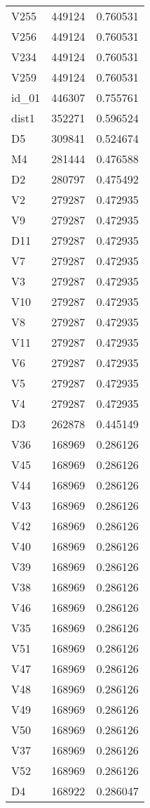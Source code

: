 \begin{tabular}{lrr}
V255 & 449124 & 0.760531 \\
V256 & 449124 & 0.760531 \\
V234 & 449124 & 0.760531 \\
V259 & 449124 & 0.760531 \\
id_01 & 446307 & 0.755761 \\
dist1 & 352271 & 0.596524 \\
D5 & 309841 & 0.524674 \\
M4 & 281444 & 0.476588 \\
D2 & 280797 & 0.475492 \\
V2 & 279287 & 0.472935 \\
V9 & 279287 & 0.472935 \\
D11 & 279287 & 0.472935 \\
V7 & 279287 & 0.472935 \\
V3 & 279287 & 0.472935 \\
V10 & 279287 & 0.472935 \\
V8 & 279287 & 0.472935 \\
V11 & 279287 & 0.472935 \\
V6 & 279287 & 0.472935 \\
V5 & 279287 & 0.472935 \\
V4 & 279287 & 0.472935 \\
D3 & 262878 & 0.445149 \\
V36 & 168969 & 0.286126 \\
V45 & 168969 & 0.286126 \\
V44 & 168969 & 0.286126 \\
V43 & 168969 & 0.286126 \\
V42 & 168969 & 0.286126 \\
V40 & 168969 & 0.286126 \\
V39 & 168969 & 0.286126 \\
V38 & 168969 & 0.286126 \\
V46 & 168969 & 0.286126 \\
V35 & 168969 & 0.286126 \\
V51 & 168969 & 0.286126 \\
V47 & 168969 & 0.286126 \\
V48 & 168969 & 0.286126 \\
V49 & 168969 & 0.286126 \\
V50 & 168969 & 0.286126 \\
V37 & 168969 & 0.286126 \\
V52 & 168969 & 0.286126 \\
D4 & 168922 & 0.286047 \\

\end{tabular}

